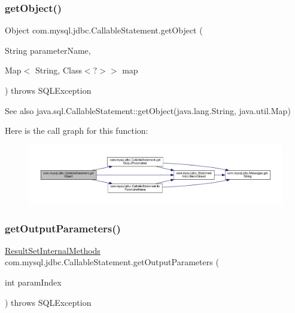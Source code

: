 \subsubsection{\texorpdfstring{get\+Object()}{getObject()}\hspace{0.1cm}{\footnotesize\ttfamily [4/4]}}
{\footnotesize\ttfamily Object com.\+mysql.\+jdbc.\+Callable\+Statement.\+get\+Object (\begin{DoxyParamCaption}\item[{String}]{parameter\+Name,  }\item[{Map$<$ String, Class$<$?$>$$>$}]{map }\end{DoxyParamCaption}) throws S\+Q\+L\+Exception}

\begin{DoxySeeAlso}{See also}
java.\+sql.\+Callable\+Statement\+::get\+Object(java.\+lang.\+String, java.\+util.\+Map) 
\end{DoxySeeAlso}
Here is the call graph for this function\+:\nopagebreak
\begin{figure}[H]
\begin{center}
\leavevmode
\includegraphics[width=350pt]{classcom_1_1mysql_1_1jdbc_1_1_callable_statement_ac622bfc97a9ee7a1a3658629d2f5d425_cgraph}
\end{center}
\end{figure}
\mbox{\label{classcom_1_1mysql_1_1jdbc_1_1_callable_statement_a1182e743ef39610d0aaa8cda05648433}} 
\subsubsection{\texorpdfstring{get\+Output\+Parameters()}{getOutputParameters()}}
{\footnotesize\ttfamily \mbox{\hyperlink{interfacecom_1_1mysql_1_1jdbc_1_1_result_set_internal_methods}{Result\+Set\+Internal\+Methods}} com.\+mysql.\+jdbc.\+Callable\+Statement.\+get\+Output\+Parameters (\begin{DoxyParamCaption}\item[{int}]{param\+Index }\end{DoxyParamCaption}) throws S\+Q\+L\+Exception\hspace{0.3cm}{\ttfamily [protected]}}

